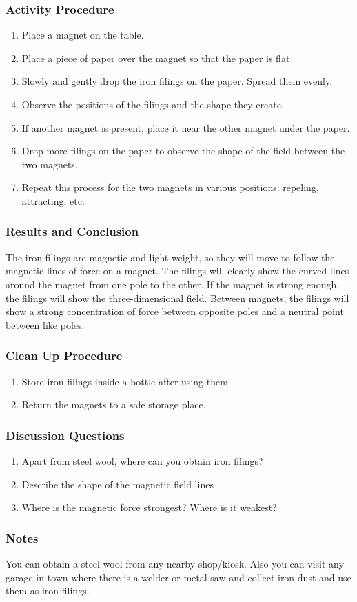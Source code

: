 \subsubsection*{Activity Procedure}
\begin{enumerate}
\item{Place a magnet on the table.}
\item{Place a piece of paper over the magnet so that the paper is flat}
\item{Slowly and gently drop the iron filings on the paper.  Spread them evenly.}
\item{Observe the positions of the filings and the shape they create.}
\item{If another magnet is present, place it near the other magnet under the paper.}
\item{Drop more filings on the paper to observe the shape of the field between the two magnets.}
\item{Repeat this process for the two magnets in various positions: repeling, attracting, etc.}
\end{enumerate}

\subsubsection*{Results and Conclusion}
The iron filings are magnetic and light-weight, so they will move to follow the magnetic lines of force on a magnet.  The filings will clearly show the curved lines around the magnet from one pole to the other.  If the magnet is strong enough, the filings will show the three-dimensional field.
Between magnets, the filings will show a strong concentration of force between opposite poles and a neutral point between like poles.

\subsubsection*{Clean Up Procedure}
\begin{enumerate}
\item{Store iron filings inside a bottle after using them}
\item{Return the magnets to a safe storage place.}
\end{enumerate}

\subsubsection*{Discussion Questions}
\begin{enumerate}
\item{Apart from steel wool, where can you obtain iron filings?}
\item{Describe the shape of the magnetic field lines}
\item{Where is the magnetic force strongest?  Where is it weakest?}
\end{enumerate}

\subsubsection*{Notes}
You can obtain a steel wool from any nearby shop/kiosk. Also you can visit any garage in town where there is a welder or metal saw and collect iron dust and use them as iron filings.
